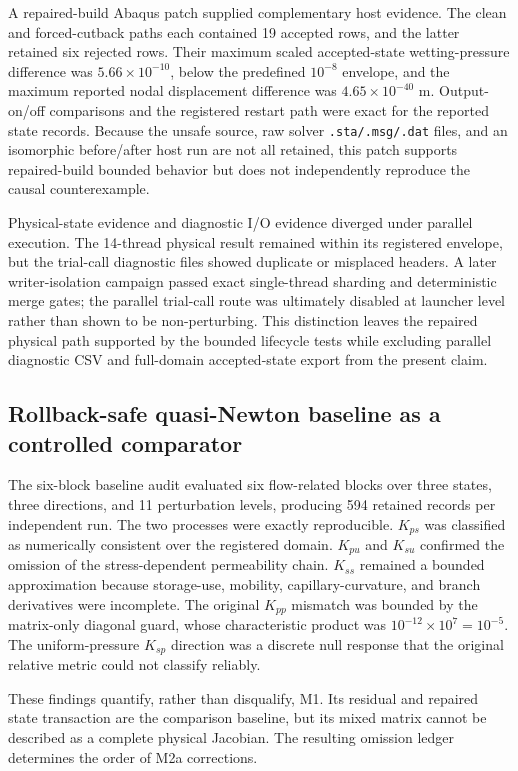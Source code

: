 \documentclass[preprint,12pt,authoryear]{elsarticle}
\begin{document}
A repaired-build Abaqus patch supplied complementary host evidence. The clean and forced-cutback paths each contained 19 accepted rows, and the latter retained six rejected rows. Their maximum scaled accepted-state wetting-pressure difference was $5.66\times10^{-10}$, below the predefined $10^{-8}$ envelope, and the maximum reported nodal displacement difference was $4.65\times10^{-40}$ m. Output-on/off comparisons and the registered restart path were exact for the reported state records. Because the unsafe source, raw solver \texttt{.sta/.msg/.dat} files, and an isomorphic before/after host run are not all retained, this patch supports repaired-build bounded behavior but does not independently reproduce the causal counterexample.

Physical-state evidence and diagnostic I/O evidence diverged under parallel execution. The 14-thread physical result remained within its registered envelope, but the trial-call diagnostic files showed duplicate or misplaced headers. A later writer-isolation campaign passed exact single-thread sharding and deterministic merge gates; the parallel trial-call route was ultimately disabled at launcher level rather than shown to be non-perturbing. This distinction leaves the repaired physical path supported by the bounded lifecycle tests while excluding parallel diagnostic CSV and full-domain accepted-state export from the present claim.

\subsection{Rollback-safe quasi-Newton baseline as a controlled comparator}

The six-block baseline audit evaluated six flow-related blocks over three states, three directions, and 11 perturbation levels, producing 594 retained records per independent run. The two processes were exactly reproducible. $K_{ps}$ was classified as numerically consistent over the registered domain. $K_{pu}$ and $K_{su}$ confirmed the omission of the stress-dependent permeability chain. $K_{ss}$ remained a bounded approximation because storage-use, mobility, capillary-curvature, and branch derivatives were incomplete. The original $K_{pp}$ mismatch was bounded by the matrix-only diagonal guard, whose characteristic product was $10^{-12}\times10^7=10^{-5}$. The uniform-pressure $K_{sp}$ direction was a discrete null response that the original relative metric could not classify reliably.

These findings quantify, rather than disqualify, M1. Its residual and repaired state transaction are the comparison baseline, but its mixed matrix cannot be described as a complete physical Jacobian. The resulting omission ledger determines the order of M2a corrections.
\end{document}
